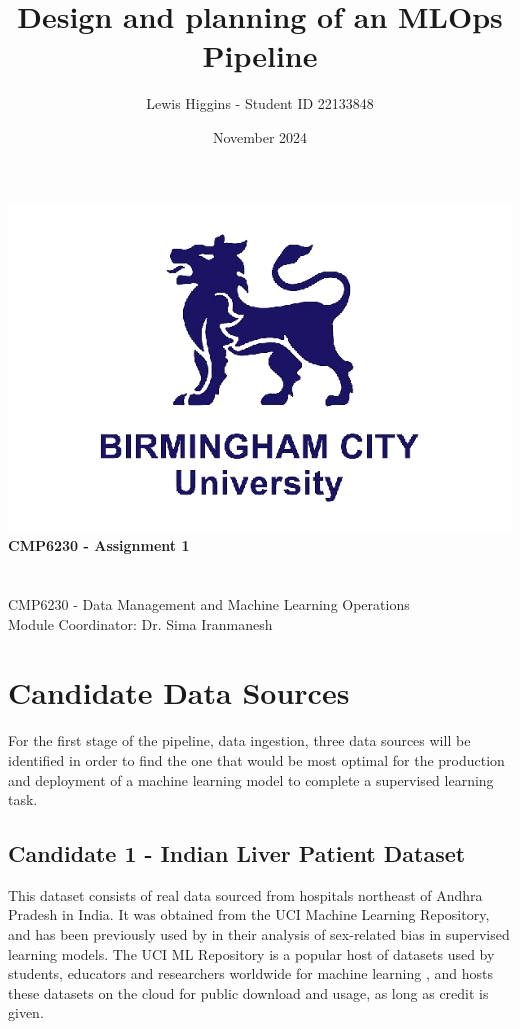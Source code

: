 \documentclass[12pt]{report}
\title{Design and planning of an MLOps Pipeline}
\author{Lewis Higgins - Student ID 22133848}
\date{November 2024}
\begin{document}
\makeatletter
\begin{titlepage}
    \begin{center}
        \includegraphics[width=0.7\linewidth]{BCU}\\[4ex]
        {\huge \bfseries CMP6230 - Assignment 1}\\[2ex]
        {\large \bfseries  \@title}\\[50ex]
        {\@author}\\[2ex]
        {CMP6230 - Data Management and Machine Learning Operations}\\[2ex]
        {Module Coordinator: Dr. Sima Iranmanesh}\\[10ex]
    \end{center}
\end{titlepage}
\makeatother
\thispagestyle{empty}
\newpage


\setcounter{page}{0}


\tableofcontents
\thispagestyle{empty}


\chapter{Candidate Data Sources}
For the first stage of the pipeline, data ingestion, three data sources will be identified in order to find 
the one that would be most optimal for the production and deployment of a machine learning model to complete 
a supervised learning task.

\section{Candidate 1 - Indian Liver Patient Dataset}
This dataset \autocite{bendi_ramana_ilpd_2022} consists of real data sourced from hospitals northeast of Andhra Pradesh in India. It was obtained from the
UCI Machine Learning Repository, and has been previously used by \textcite{straw_investigating_2022} in their analysis of sex-related bias in supervised learning models. The UCI ML Repository is a popular host of datasets used by students, 
educators and researchers worldwide for machine learning \autocite{uci_machine_learning_repository_about_nodate}, and hosts these datasets 
on the cloud for public download and usage, as long as credit is given.
\end{document}
